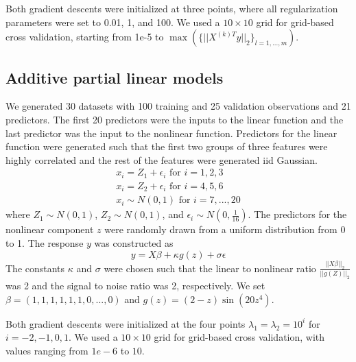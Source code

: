 \documentclass[10pt,letterpaper]{article}
\begin{document}
Both gradient descents were initialized at three points, where all regularization parameters were set to 0.01, 1, and 100. We used a $10 \times 10$ grid for grid-based cross validation, starting from 1e-5 to $\max(\{||X^{(k)T}y ||_2\}_{l=1,..., m})$.

\subsection{Additive partial linear models}

We generated 30 datasets with 100 training and 25 validation observations and 21 predictors. The first 20 predictors were the inputs to the linear function and the last predictor was the input to the nonlinear function. Predictors for the linear function were generated such that the first two groups of three features were highly correlated and the rest of the features were generated iid Gaussian.
\begin{equation}
\begin{array}{c}
x_i = Z_1 + \epsilon_i \text{ for } i=1, 2, 3 \\
x_i = Z_2 + \epsilon_i \text{ for } i= 4, 5, 6 \\
x_i \sim N(0,1) \text{ for } i = 7, ..., 20
\end{array}
\end{equation}
where $Z_1 \sim N(0,1)$, $Z_2 \sim N(0,1)$, and $\epsilon_i \sim N(0, \frac{1}{16})$. The predictors for the nonlinear component $z$ were randomly drawn from a uniform distribution from 0 to 1. The response $y$ was constructed as
\begin{equation}
y = X\beta + \kappa g(z) + \sigma \epsilon
\end{equation}
The constants $\kappa$ and $\sigma$ were chosen such that the linear to nonlinear ratio $\frac{||X\beta||_2}{||g(Z)||_2}$ was 2 and the signal to noise ratio was 2, respectively. We set $\beta = (1, 1, 1, 1, 1, 1, 0, ..., 0)$ and $g(z) =(2-z)\sin(20z^4)$.

Both gradient descents were initialized at the four points $\lambda_1 = \lambda_2 = 10^i$ for $i=-2, -1, 0, 1$. We used a $10 \times 10$ grid for grid-based cross validation, with values ranging from $1e-6$ to $10$.
\end{document}
